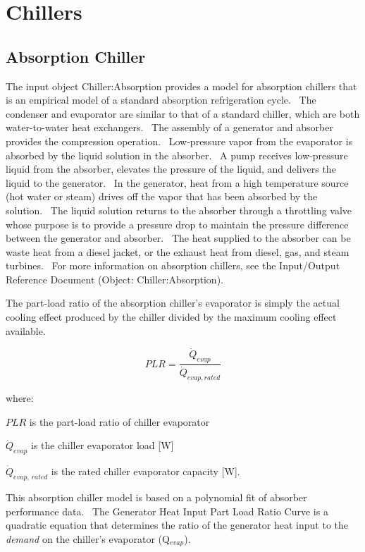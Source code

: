 \section{Chillers }\label{chillers}

\subsection{Absorption Chiller}\label{absorption-chiller}

The input object Chiller:Absorption provides a model for absorption chillers that is an empirical model of a standard absorption refrigeration cycle.~ The condenser and evaporator are similar to that of a standard chiller, which are both water-to-water heat exchangers.~ The assembly of a generator and absorber provides the compression operation.~ Low-pressure vapor from the evaporator is absorbed by the liquid solution in the absorber.~ A pump receives low-pressure liquid from the absorber, elevates the pressure of the liquid, and delivers the liquid to the generator.~ In the generator, heat from a high temperature source (hot water or steam) drives off the vapor that has been absorbed by the solution.~ The liquid solution returns to the absorber through a throttling valve whose purpose is to provide a pressure drop to maintain the pressure difference between the generator and absorber.~ The heat supplied to the absorber can be waste heat from a diesel jacket, or the exhaust heat from diesel, gas, and steam turbines.~ For more information on absorption chillers, see the Input/Output Reference Document (Object: Chiller:Absorption).

The part-load ratio of the absorption chiller's evaporator is simply the actual cooling effect produced by the chiller divided by the maximum cooling effect available.

\begin{equation}
PLR = \frac{\dot{Q}_{evap}}{\dot{Q}_{evap,rated}}
\end{equation}

where:

\(PLR\) is the part-load ratio of chiller evaporator

\({\dot Q_{evap}}\) is the chiller evaporator load {[}W{]}

\({\dot Q_{evap,\,rated}}\) is the rated chiller evaporator capacity {[}W{]}.

This absorption chiller model is based on a polynomial fit of absorber performance data.~ The Generator Heat Input Part Load Ratio Curve is a quadratic equation that determines the ratio of the generator heat input to the \emph{demand} on the chiller's evaporator (Q\(_{evap}\)).

